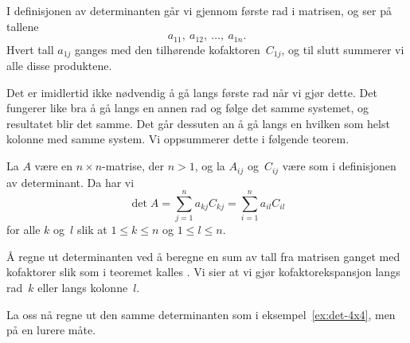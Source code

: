 I definisjonen av determinanten går vi gjennom første rad i matrisen,
og ser på tallene
\[
a_{11},\ a_{12},\ \ldots,\ a_{1n}.
\]
Hvert tall $a_{1j}$ ganges med den tilhørende kofaktoren~$C_{1j}$, og
til slutt summerer vi alle disse produktene.

Det er imidlertid ikke nødvendig å gå langs første rad når vi gjør
dette.  Det fungerer like bra å gå langs en annen rad og følge det
samme systemet, og resultatet blir det samme.  Det går dessuten an å
gå langs en hvilken som helst kolonne med samme system.  Vi
oppsummerer dette i følgende teorem.

\begin{thm}
La $A$ være en $n \times n$-matrise, der $n > 1$, og la $A_{ij}$
og~$C_{ij}$ være som i definisjonen av determinant.  Da har vi
\[
\det A
= \sum_{j=1}^n a_{kj} C_{kj}
= \sum_{i=1}^n a_{il} C_{il}
\]
for alle $k$ og~$l$ slik at $1 \le k \le n$ og $1 \le l \le n$.
\end{thm}

Å regne ut determinanten ved å beregne en sum av tall fra matrisen
ganget med kofaktorer slik som i teoremet kalles
.  Vi sier at vi gjør kofaktorekspansjon
langs rad~$k$ eller langs kolonne~$l$.

La oss nå regne ut den samme determinanten som i
eksempel~\ref{ex:det-4x4}, men på en lurere måte.

